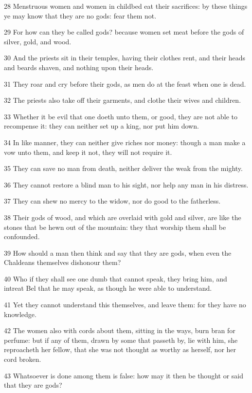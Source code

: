 \par 28 Menstruous women and women in childbed eat their sacrifices: by these things ye may know that they are no gods: fear them not.
\par 29 For how can they be called gods? because women set meat before the gods of silver, gold, and wood.
\par 30 And the priests sit in their temples, having their clothes rent, and their heads and beards shaven, and nothing upon their heads.
\par 31 They roar and cry before their gods, as men do at the feast when one is dead.
\par 32 The priests also take off their garments, and clothe their wives and children.
\par 33 Whether it be evil that one doeth unto them, or good, they are not able to recompense it: they can neither set up a king, nor put him down.
\par 34 In like manner, they can neither give riches nor money: though a man make a vow unto them, and keep it not, they will not require it.
\par 35 They can save no man from death, neither deliver the weak from the mighty.
\par 36 They cannot restore a blind man to his sight, nor help any man in his distress.
\par 37 They can shew no mercy to the widow, nor do good to the fatherless.
\par 38 Their gods of wood, and which are overlaid with gold and silver, are like the stones that be hewn out of the mountain: they that worship them shall be confounded.
\par 39 How should a man then think and say that they are gods, when even the Chaldeans themselves dishonour them?
\par 40 Who if they shall see one dumb that cannot speak, they bring him, and intreat Bel that he may speak, as though he were able to understand.
\par 41 Yet they cannot understand this themselves, and leave them: for they have no knowledge.
\par 42 The women also with cords about them, sitting in the ways, burn bran for perfume: but if any of them, drawn by some that passeth by, lie with him, she reproacheth her fellow, that she was not thought as worthy as herself, nor her cord broken.
\par 43 Whatsoever is done among them is false: how may it then be thought or said that they are gods?
